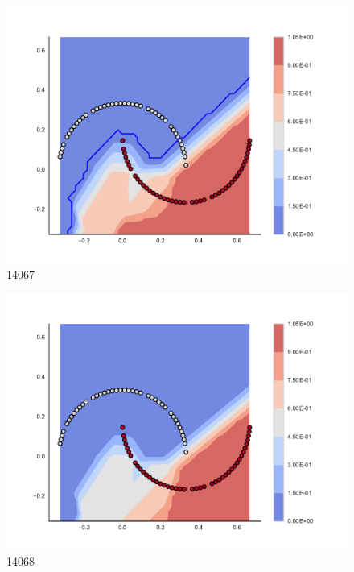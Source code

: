 \begin{subfigure}[b]{0.09\textwidth}
    \includegraphics[clip, trim=2.35cm 1.75cm 4.5cm 0cm,width=\textwidth]{img/convergence/14067.pdf}
    \caption{14067}
    \label{fig:convergence_14067}
\end{subfigure}
%
\begin{subfigure}[b]{0.09\textwidth}
    \includegraphics[clip, trim=2.35cm 1.75cm 4.5cm 0cm,width=\textwidth]{img/convergence/14068.pdf}
    \caption{14068}
    \label{fig:convergence_14068}
\end{subfigure}
%
